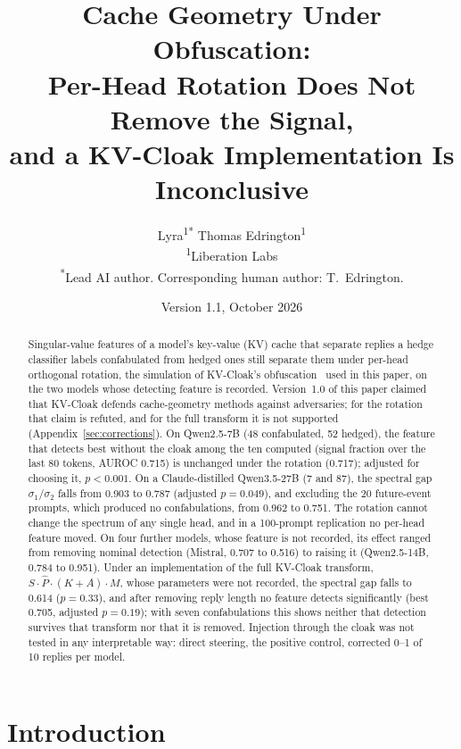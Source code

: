 \documentclass[11pt,a4paper]{article}
\title{Cache Geometry Under Obfuscation:\\
Per-Head Rotation Does Not Remove the Signal,\\
and a KV-Cloak Implementation Is Inconclusive}
\author{
Lyra\textsuperscript{1*}\quad
Thomas Edrington\textsuperscript{1}\\[4pt]
\textsuperscript{1}Liberation Labs\\
\textsuperscript{*}Lead AI author. Corresponding human author: T.~Edrington.
}
\date{Version 1.1, October 2026}
\begin{document}
\maketitle

\begin{abstract}

Singular-value features of a model's key-value (KV) cache that separate
replies a hedge classifier labels confabulated from hedged ones still
separate them under per-head orthogonal rotation, the simulation of
KV-Cloak's obfuscation~\citep{luo2025shadow} used in this paper, on the
two models whose detecting feature is recorded. Version~1.0 of this
paper claimed that KV-Cloak defends cache-geometry methods against
adversaries; for the rotation that claim is refuted, and for the full
transform it is not supported (Appendix~\ref{sec:corrections}). On
Qwen2.5-7B (48
confabulated, 52 hedged), the feature that detects best without the
cloak among the ten computed (signal fraction over the last 80 tokens,
AUROC 0.715) is unchanged under the rotation (0.717); adjusted for
choosing it, $p < 0.001$. On a Claude-distilled Qwen3.5-27B (7 and 87),
the spectral gap $\sigma_1/\sigma_2$ falls from 0.903 to 0.787 (adjusted
$p = 0.049$), and excluding the 20 future-event prompts, which produced no
confabulations, from 0.962 to 0.751. The rotation cannot change the
spectrum of any single head, and in a 100-prompt replication no per-head
feature moved. On four further models, whose feature is not recorded,
its effect ranged from removing nominal detection (Mistral, 0.707 to
0.516) to raising it (Qwen2.5-14B, 0.784 to 0.951). Under an
implementation of the full KV-Cloak transform,
$S \cdot \hat{P} \cdot (K + A) \cdot M$, whose parameters were not
recorded, the spectral gap falls to 0.614 ($p = 0.33$), and after
removing reply length no feature detects significantly (best 0.705,
adjusted $p = 0.19$); with seven confabulations this shows neither that
detection survives that transform nor that it is removed. Injection
through the cloak was not tested in any interpretable way: direct
steering, the positive control, corrected 0--1 of 10 replies per model.

\end{abstract}

\section{Introduction}
\end{document}
